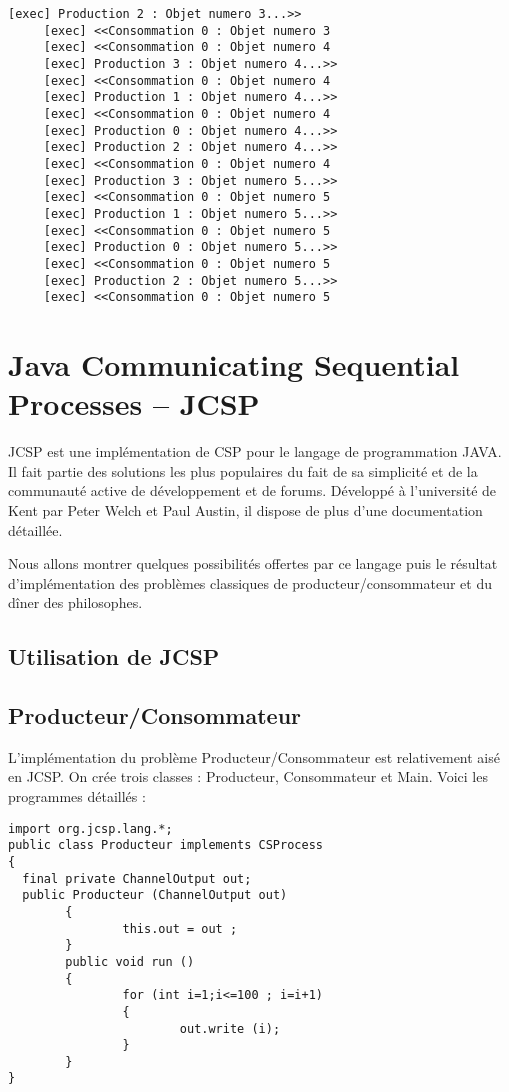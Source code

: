 \documentclass[a4paper,11pt,french]{report}
\begin{document}
\begin{lstlisting}[frame=trBL,title={Producteurs-Consommateurs : Résultat de l'éxécution}, firstnumber=last]
     [exec] Production 2 : Objet numero 3...>>
     [exec] <<Consommation 0 : Objet numero 3
     [exec] <<Consommation 0 : Objet numero 4
     [exec] Production 3 : Objet numero 4...>>
     [exec] <<Consommation 0 : Objet numero 4
     [exec] Production 1 : Objet numero 4...>>
     [exec] <<Consommation 0 : Objet numero 4
     [exec] Production 0 : Objet numero 4...>>
     [exec] Production 2 : Objet numero 4...>>
     [exec] <<Consommation 0 : Objet numero 4
     [exec] Production 3 : Objet numero 5...>>
     [exec] <<Consommation 0 : Objet numero 5
     [exec] Production 1 : Objet numero 5...>>
     [exec] <<Consommation 0 : Objet numero 5
     [exec] Production 0 : Objet numero 5...>>
     [exec] <<Consommation 0 : Objet numero 5
     [exec] Production 2 : Objet numero 5...>>
     [exec] <<Consommation 0 : Objet numero 5
\end{lstlisting} 

\chapter[JCSP]{Java Communicating Sequential Processes -- JCSP}

JCSP est une implémentation de CSP pour le langage de programmation JAVA. Il fait partie des solutions les plus populaires du fait de sa simplicité et de la communauté active de développement et de forums. Développé à l'université de Kent par Peter Welch et Paul Austin, il dispose de plus d'une documentation détaillée.

Nous allons montrer quelques possibilités offertes par ce langage puis le résultat d'implémentation des problèmes classiques de producteur/consommateur et du dîner des philosophes.

\section{Utilisation de JCSP}

\section{Producteur/Consommateur}

L'implémentation du problème Producteur/Consommateur est relativement aisé en JCSP. On crée trois classes : Producteur, Consommateur et Main. Voici les programmes détaillés :

\begin{lstlisting}[frame=trBL,title={Producteurs-Consommateurs: Producteur.java}]
import org.jcsp.lang.*;
public class Producteur implements CSProcess
{
  final private ChannelOutput out;
  public Producteur (ChannelOutput out)
        {
                this.out = out ;
        }
        public void run ()
        {
                for (int i=1;i<=100 ; i=i+1)
                {
                        out.write (i);
                }
        }
}
\end{lstlisting}
\end{document}
